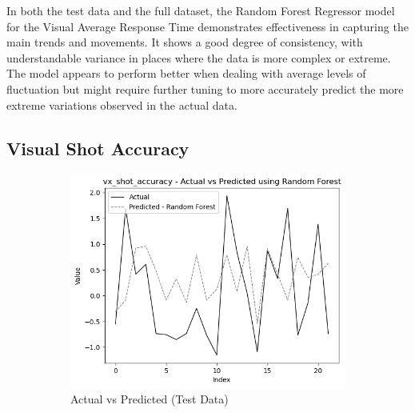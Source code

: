 In both the test data and the full dataset, the Random Forest Regressor model for the Visual Average Response Time demonstrates effectiveness in capturing the main trends and movements.
It shows a good degree of consistency, with understandable variance in places where the data is more complex or extreme. The model appears to perform better when dealing with average levels of
fluctuation but might require further tuning to more accurately predict the more extreme variations observed in the actual data.


\subsection*{Visual Shot Accuracy}

\begin{figure}[htbp]
    \centering
    \begin{subfigure}[b]{0.49\textwidth}
        \centering
        \includegraphics[width=\textwidth]{images/regressionCharts/test_data_visual_shot_accuracy.png}
        \caption{Actual vs Predicted (Test Data)}
        \label{fig:actual_vs_predicted_vx_shot_accuracy_test}
    \end{subfigure}\hfill
    \begin{subfigure}[b]{0.49\textwidth}
        \centering

\end{subfigure}
\end{figure}
